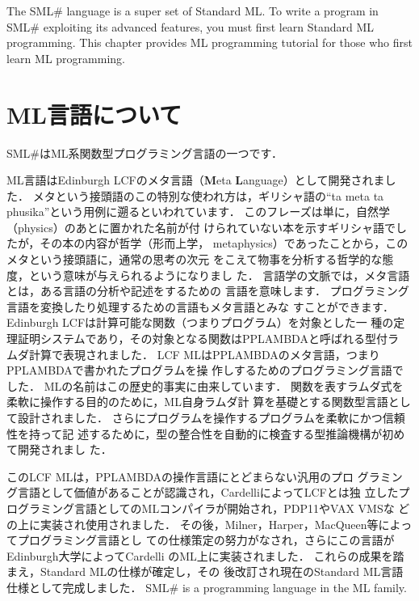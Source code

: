 \documentclass{jbook}
\newif\ifjp
\newcommand{\txt}[2]{#1}
\newcommand{\smlsharp}{SML\#}
\begin{document}
\ifjp%
	\smlsharp{}言語は，Standard ML言語と後方互換性のあるプログラミン
グ言語です．
	\smlsharp{}の高度な機能を使いこなすために，本章でまず，Standard
MLプログラミングの基礎を学びましょう．

\else%
	The \smlsharp{} language is a super set of Standard ML.
	To write a program in \smlsharp{} exploiting its advanced
features, you must first learn Standard ML programming.
	This chapter provides ML programming tutorial for those who
first learn ML programming.


\fi%

\section{\txt{ML言語について}{About the ML language family}}
\label{sec:tutorialMllanguage}

\ifjp%
	\smlsharp{}はML系関数型プログラミング言語の一つです．

	ML言語はEdinburgh LCF\cite{gord79}のメタ言語（{\bf M}eta {\bf
L}anguage）として開発されました．
	メタという接頭語のこの特別な使われ方は，ギリシャ語の``ta meta ta
phusika''という用例に遡るといわれています．
	このフレーズは単に，自然学（physics）のあとに置かれた名前が付
けられていない本を示すギリシャ語でしたが，その本の内容が哲学（形而上学，
metaphysics）であったことから，このメタという接頭語に，通常の思考の次元
をこえて物事を分析する哲学的な態度，という意味が与えられるようになりまし
た．
	言語学の文脈では，メタ言語とは，ある言語の分析や記述をするための
言語を意味します．
	プログラミング言語を変換したり処理するための言語もメタ言語とみな
すことができます．
	Edinburgh LCFは計算可能な関数（つまりプログラム）を対象とした一
種の定理証明システムであり，その対象となる関数はPPLAMBDAと呼ばれる型付ラ
ムダ計算で表現されました．
	LCF MLはPPLAMBDAのメタ言語，つまりPPLAMBDAで書かれたプログラムを操
作しするためのプログラミング言語でした．
	MLの名前はこの歴史的事実に由来しています．
	関数を表すラムダ式を柔軟に操作する目的のために，ML自身ラムダ計
算を基礎とする関数型言語として設計されました．
	さらにプログラムを操作するプログラムを柔軟にかつ信頼性を持って記
述するために，型の整合性を自動的に検査する型推論機構が初めて開発されまし
た．

	このLCF MLは，PPLAMBDAの操作言語にとどまらない汎用のプロ
グラミング言語として価値があることが認識され，CardelliによってLCFとは独
立したプログラミング言語としてのMLコンパイラが開始され，PDP11やVAX VMSな
どの上に実装され使用されました．
	その後，Milner，Harper，MacQueen等によってプログラミング言語とし
ての仕様策定の努力がなされ，さらにこの言語がEdinburgh大学によってCardelli
のML上に実装されました．
	これらの成果を踏まえ，Standard MLの仕様\cite{sml}が確定し，その
後改訂され現在のStandard ML言語仕様\cite{sml97}として完成しました．
\else%
	\smlsharp{} is a programming language in the ML family.
\end{document}
